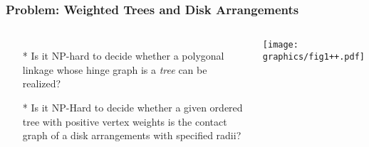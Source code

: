 \documentclass{beamer}
\begin{document}
\begin{frame}\frametitle{Problem: Weighted Trees and Disk Arrangements}
    \begin{columns}[c]
        \begin{itemize}
            \item[*] Is it NP-hard to decide whether a polygonal linkage whose hinge graph is a \textit{tree} can be realized? 
            \item[*] Is it NP-Hard to decide whether a given ordered tree with positive vertex weights is the contact graph of a disk arrangements with specified radii?
        \end{itemize}
        \begin{minipage}{\linewidth}
            \begin{center}
            \texttt{[image: graphics/fig1++.pdf]}
            \end{center}
        \end{minipage}
    \end{columns}
\end{frame}

        
\end{document}
